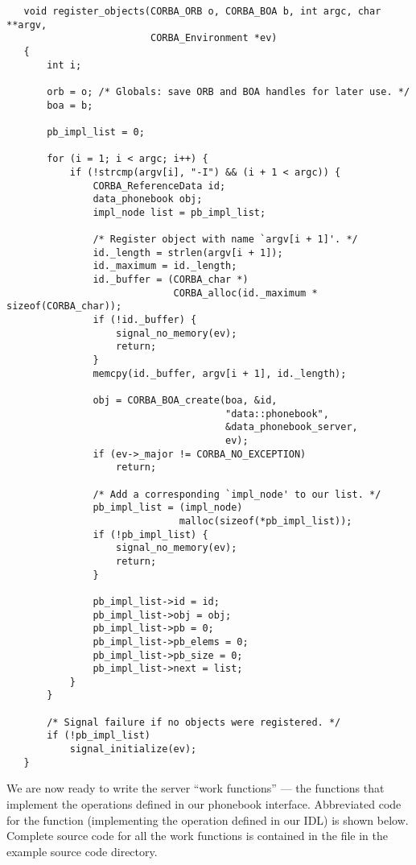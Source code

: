 \begin{verbatim}
   void register_objects(CORBA_ORB o, CORBA_BOA b, int argc, char **argv,
                         CORBA_Environment *ev)
   {
       int i;

       orb = o; /* Globals: save ORB and BOA handles for later use. */
       boa = b;

       pb_impl_list = 0;

       for (i = 1; i < argc; i++) {
           if (!strcmp(argv[i], "-I") && (i + 1 < argc)) {
               CORBA_ReferenceData id;
               data_phonebook obj;
               impl_node list = pb_impl_list;

               /* Register object with name `argv[i + 1]'. */
               id._length = strlen(argv[i + 1]);
               id._maximum = id._length;
               id._buffer = (CORBA_char *)
                             CORBA_alloc(id._maximum * sizeof(CORBA_char));
               if (!id._buffer) {
                   signal_no_memory(ev);
                   return;
               }
               memcpy(id._buffer, argv[i + 1], id._length);

               obj = CORBA_BOA_create(boa, &id,
                                      "data::phonebook",
                                      &data_phonebook_server,
                                      ev);
               if (ev->_major != CORBA_NO_EXCEPTION)
                   return;

               /* Add a corresponding `impl_node' to our list. */
               pb_impl_list = (impl_node)
                              malloc(sizeof(*pb_impl_list));
               if (!pb_impl_list) {
                   signal_no_memory(ev);
                   return;
               }

               pb_impl_list->id = id;
               pb_impl_list->obj = obj;
               pb_impl_list->pb = 0;
               pb_impl_list->pb_elems = 0;
               pb_impl_list->pb_size = 0;
               pb_impl_list->next = list;
           }
       }

       /* Signal failure if no objects were registered. */
       if (!pb_impl_list)
           signal_initialize(ev);
   }
\end{verbatim}

We are now ready to write the server ``work functions'' --- the functions that
implement the operations defined in our phonebook interface.  Abbreviated code
for the  function (implementing the 
operation defined in our IDL) is shown below.  Complete source code for all the
work functions is contained in the  file in the
example source code directory.

